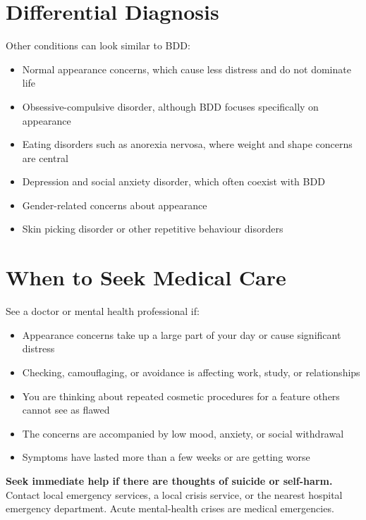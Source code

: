 \section*{Differential Diagnosis}
Other conditions can look similar to BDD:

\begin{itemize}
    \item Normal appearance concerns, which cause less distress and do not dominate life
    \item Obsessive-compulsive disorder, although BDD focuses specifically on appearance
    \item Eating disorders such as anorexia nervosa, where weight and shape concerns are central
    \item Depression and social anxiety disorder, which often coexist with BDD
    \item Gender-related concerns about appearance
    \item Skin picking disorder or other repetitive behaviour disorders
\end{itemize}

\section*{When to Seek Medical Care}
See a doctor or mental health professional if:

\begin{itemize}
    \item Appearance concerns take up a large part of your day or cause significant distress
    \item Checking, camouflaging, or avoidance is affecting work, study, or relationships
    \item You are thinking about repeated cosmetic procedures for a feature others cannot see as flawed
    \item The concerns are accompanied by low mood, anxiety, or social withdrawal
    \item Symptoms have lasted more than a few weeks or are getting worse
\end{itemize}

\textbf{Seek immediate help if there are thoughts of suicide or self-harm.} Contact local emergency services, a local crisis service, or the nearest hospital emergency department. Acute mental-health crises are medical emergencies.


